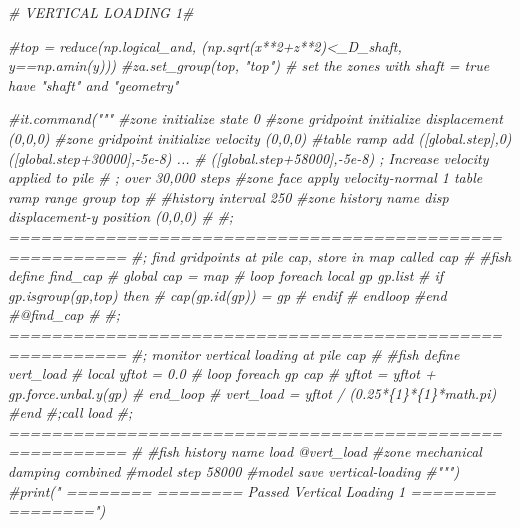 \documentclass[a4paper, nobind]{templates/ociamthesis}
\newenvironment{Shaded}{\begin{snugshade}}{\end{snugshade}}
\newcommand{\CommentTok}[1]{\textcolor[rgb]{0.56,0.35,0.01}{\textit{#1}}}
\renewenvironment{Shaded}
{
  \vspace{10pt}%
  \begin{snugshade}%
}{%
  \end{snugshade}%
  \vspace{8pt}%
}
\begin{document}
\begin{Shaded}
\begin{Highlighting}[]
\CommentTok{\# VERTICAL LOADING 1\#}

\CommentTok{\#top = reduce(np.logical\_and, (np.sqrt(x**2+z**2)\textless{}\_D\_shaft, y==np.amin(y)))}
\CommentTok{\#za.set\_group(top, "top") \# set the zones with shaft = true have "shaft" and "geometry"}

\CommentTok{\#it.command("""}
\CommentTok{\#zone initialize state 0}
\CommentTok{\#zone gridpoint initialize displacement (0,0,0)}
\CommentTok{\#zone gridpoint initialize velocity     (0,0,0)}
\CommentTok{\#table \textquotesingle{}ramp\textquotesingle{} add ([global.step],0) ([global.step+30000],{-}5e{-}8) ...}
\CommentTok{\#      ([global.step+58000],{-}5e{-}8) ; Increase velocity applied to pile}
\CommentTok{\#                                  ; over 30,000 steps}
\CommentTok{\#zone face apply velocity{-}normal 1 table \textquotesingle{}ramp\textquotesingle{} range group \textquotesingle{}top\textquotesingle{}}
\CommentTok{\#}
\CommentTok{\#history interval 250}
\CommentTok{\#zone history name \textquotesingle{}disp\textquotesingle{} displacement{-}y position (0,0,0)}
\CommentTok{\#}
\CommentTok{\#; =========================================================}
\CommentTok{\#;  find gridpoints at pile cap, store in map called cap}
\CommentTok{\#}
\CommentTok{\#fish define find\_cap}
\CommentTok{\#    global cap = map}
\CommentTok{\#    loop foreach local gp gp.list}
\CommentTok{\#        if gp.isgroup(gp,\textquotesingle{}top\textquotesingle{}) then}
\CommentTok{\#            cap(gp.id(gp)) = gp}
\CommentTok{\#        endif}
\CommentTok{\#    endloop}
\CommentTok{\#end}
\CommentTok{\#@find\_cap}
\CommentTok{\#}
\CommentTok{\#; =========================================================}
\CommentTok{\#; monitor vertical loading at pile cap}
\CommentTok{\#}
\CommentTok{\#fish define vert\_load}
\CommentTok{\#    local yftot = 0.0}
\CommentTok{\#    loop foreach gp cap}
\CommentTok{\#        yftot = yftot + gp.force.unbal.y(gp)}
\CommentTok{\#    end\_loop}
\CommentTok{\#    vert\_load = yftot / (0.25*\{1\}*\{1\}*math.pi)}
\CommentTok{\#end}
\CommentTok{\#;call \textquotesingle{}load\textquotesingle{}}
\CommentTok{\#; =========================================================}
\CommentTok{\#}
\CommentTok{\#fish history name \textquotesingle{}load\textquotesingle{} @vert\_load}
\CommentTok{\#zone mechanical damping combined}
\CommentTok{\#model step 58000}
\CommentTok{\#model save \textquotesingle{}vertical{-}loading\textquotesingle{}}
\CommentTok{\#""")}
\CommentTok{\#print("               ========       ======== Passed Vertical Loading 1 ========        ========")}

\end{Highlighting}
\end{Shaded}
\end{document}
